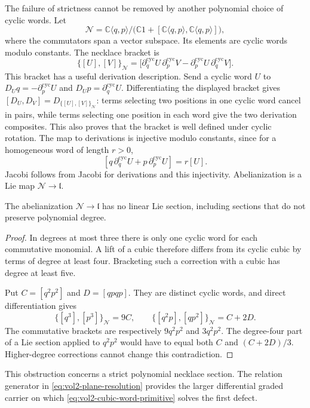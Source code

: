 The failure of strictness cannot be removed by another polynomial
choice of cyclic words. Let
\[
 \mathcal N=
 \mathbb C\langle q,p\rangle/
 \bigl(\mathbb C1+[\mathbb C\langle q,p\rangle,
                         \mathbb C\langle q,p\rangle]\bigr),
\]
where the commutators span a vector subspace. Its elements are
cyclic words modulo constants. The necklace bracket is
\[
 \{[U],[V]\}_{\mathcal N}
   =\bigl[\partial_q^{\mathrm{cyc}}U\,
               \partial_p^{\mathrm{cyc}}V
          -\partial_p^{\mathrm{cyc}}U\,
               \partial_q^{\mathrm{cyc}}V\bigr].
\]
This bracket has a useful derivation description. Send a cyclic
word $U$ to $D_Uq=-\partial_p^{\mathrm{cyc}}U$ and
$D_Up=\partial_q^{\mathrm{cyc}}U$. Differentiating the displayed
bracket gives
$[D_U,D_V]=D_{\{[U],[V]\}_{\mathcal N}}$: terms selecting
two positions in one cyclic word cancel in pairs, while terms
selecting one position in each word give the two derivation
composites. This also proves that the bracket is well defined
under cyclic rotation. The map to derivations is injective
modulo constants, since for a homogeneous word of length $r>0$,
\[
 [q\,\partial_q^{\mathrm{cyc}}U
   +p\,\partial_p^{\mathrm{cyc}}U]=r[U].
\]
Jacobi follows from Jacobi for derivations and this injectivity.
Abelianization is a Lie map $\mathcal N\to\mathfrak l$.

\begin{proposition}\label{prop:vol2-necklace-no-section}
The abelianization $\mathcal N\to\mathfrak l$ has no linear
Lie section, including sections that do not preserve polynomial
degree.
\end{proposition}
\begin{proof}
In degrees at most three there is only one cyclic word for each
commutative monomial. A lift of a cubic therefore differs from
its cyclic cubic by terms of degree at least four. Bracketing
such a correction with a cubic has degree at least five.

Put $C=[q^2p^2]$ and $D=[qpqp]$. They are distinct cyclic words,
and direct differentiation gives
\[
 \{[q^3],[p^3]\}_{\mathcal N}=9C,
 \qquad \{[q^2p],[qp^2]\}_{\mathcal N}=C+2D.
\]
The commutative brackets are respectively $9q^2p^2$ and
$3q^2p^2$. The degree-four part of a Lie section applied to
$q^2p^2$ would have to equal both $C$ and $(C+2D)/3$.
Higher-degree corrections cannot change this contradiction.
\end{proof}

This obstruction concerns a strict polynomial necklace section.
The relation generator in \eqref{eq:vol2-plane-resolution}
provides the larger differential graded carrier on which
\eqref{eq:vol2-cubic-word-primitive} solves the first defect.

